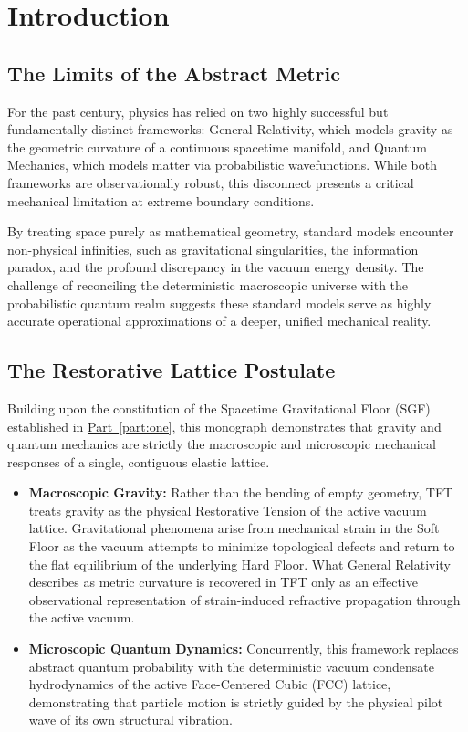 \chapter{Introduction}
\label{chap:part2_intro}

\section{The Limits of the Abstract Metric}
For the past century, physics has relied on two highly successful but fundamentally distinct frameworks: General Relativity, which models gravity as the geometric curvature of a continuous spacetime manifold, and Quantum Mechanics, which models matter via probabilistic wavefunctions. While both frameworks are observationally robust, this disconnect presents a critical mechanical limitation at extreme boundary conditions.

By treating space purely as mathematical geometry, standard models encounter non-physical infinities, such as gravitational singularities, the information paradox, and the profound discrepancy in the vacuum energy density. The challenge of reconciling the deterministic macroscopic universe with the probabilistic quantum realm suggests these standard models serve as highly accurate operational approximations of a deeper, unified mechanical reality.

\section{The Restorative Lattice Postulate}
Building upon the constitution of the Spacetime Gravitational Floor (SGF) established in \hyperref[part:one]{Part~\ref{part:one}}, this monograph demonstrates that gravity and quantum mechanics are strictly the macroscopic and microscopic mechanical responses of a single, contiguous elastic lattice.

\begin{itemize}
    \item \textbf{Macroscopic Gravity:} Rather than the bending of empty geometry, TFT treats gravity as the physical Restorative Tension of the active vacuum lattice. Gravitational phenomena arise from mechanical strain in the Soft Floor as the vacuum attempts to minimize topological defects and return to the flat equilibrium of the underlying Hard Floor. What General Relativity describes as metric curvature is recovered in TFT only as an effective observational representation of strain-induced refractive propagation through the active vacuum.
    \item \textbf{Microscopic Quantum Dynamics:} Concurrently, this framework replaces abstract quantum probability with the deterministic vacuum condensate hydrodynamics of the active Face-Centered Cubic (FCC) lattice, demonstrating that particle motion is strictly guided by the physical pilot wave of its own structural vibration.
\end{itemize}

